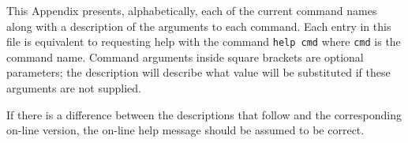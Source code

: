 %
%

This Appendix presents, alphabetically, each of the current command names
along with a description of the arguments to each command.
Each entry in this file is equivalent to
requesting help with the command
{\tt help cmd}
where {\tt cmd} is the command name.
Command arguments inside square brackets are optional parameters;
the description will describe what value will be substituted if these
arguments are not supplied.

If there is a difference between the descriptions that follow and
the corresponding on-line version,
the on-line help message should be assumed to be correct.

\begin{htmlonly}
  
\end{htmlonly}
\begin{latexonly}
  \small
  \begin{description}
    
  \end{description}
  \normalsize
\end{latexonly}
